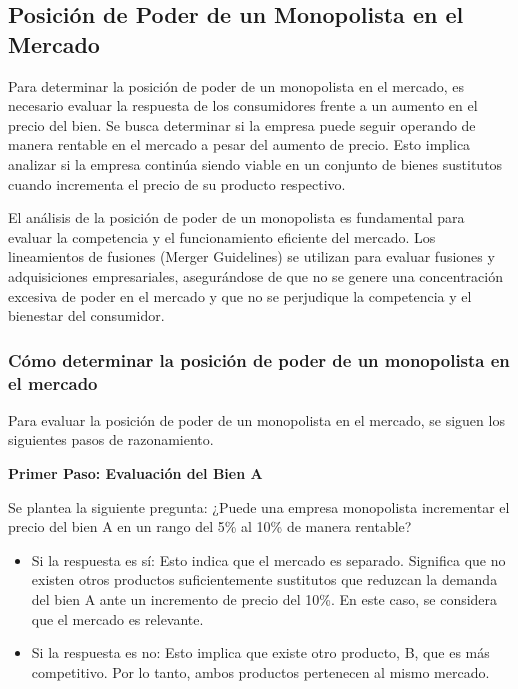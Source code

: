 \documentclass[
  doc,
  floatsintext,
  longtable,
  a4paper,
  nolmodern,
  notxfonts,
  notimes,
  12pt,
  colorlinks=true,linkcolor=blue,citecolor=blue,urlcolor=blue]{apa7}
\begin{document}
\subsection{Posición de Poder de un Monopolista en el
Mercado}\label{posiciuxf3n-de-poder-de-un-monopolista-en-el-mercado}

Para determinar la posición de poder de un monopolista en el mercado, es
necesario evaluar la respuesta de los consumidores frente a un aumento
en el precio del bien. Se busca determinar si la empresa puede seguir
operando de manera rentable en el mercado a pesar del aumento de precio.
Esto implica analizar si la empresa continúa siendo viable en un
conjunto de bienes sustitutos cuando incrementa el precio de su producto
respectivo.

El análisis de la posición de poder de un monopolista es fundamental
para evaluar la competencia y el funcionamiento eficiente del mercado.
Los lineamientos de fusiones (Merger Guidelines) se utilizan para
evaluar fusiones y adquisiciones empresariales, asegurándose de que no
se genere una concentración excesiva de poder en el mercado y que no se
perjudique la competencia y el bienestar del consumidor.

\subsubsection{Cómo determinar la posición de poder de un monopolista en
el
mercado}\label{cuxf3mo-determinar-la-posiciuxf3n-de-poder-de-un-monopolista-en-el-mercado}

Para evaluar la posición de poder de un monopolista en el mercado, se
siguen los siguientes pasos de razonamiento.

\textbf{Primer Paso: Evaluación del Bien A}

Se plantea la siguiente pregunta: ¿Puede una empresa monopolista
incrementar el precio del bien A en un rango del 5\% al 10\% de manera
rentable?

\begin{itemize}
\item
  Si la respuesta es sí: Esto indica que el mercado es separado.
  Significa que no existen otros productos suficientemente sustitutos
  que reduzcan la demanda del bien A ante un incremento de precio del
  10\%. En este caso, se considera que el mercado es relevante.
\item
  Si la respuesta es no: Esto implica que existe otro producto, B, que
  es más competitivo. Por lo tanto, ambos productos pertenecen al mismo
  mercado.
\end{itemize}
\end{document}
